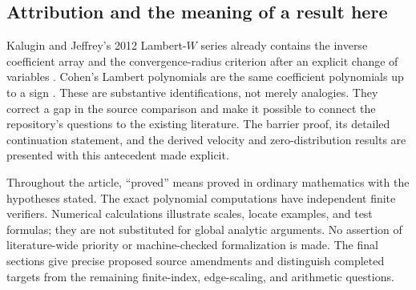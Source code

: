 \subsection{Attribution and the meaning of a result here}

Kalugin and Jeffrey's 2012 Lambert-$W$ series already contains the
inverse coefficient array and the convergence-radius criterion after
an explicit change of variables \cite{KaluginJeffrey2012}. Cohen's
Lambert polynomials are the same coefficient polynomials up to a sign
\cite{Cohen2021}. These are substantive identifications, not merely
analogies. They correct a gap in the source comparison and make it
possible to connect the repository's questions to the existing
literature. The barrier proof, its detailed continuation statement,
and the derived velocity and zero-distribution results are presented
with this antecedent made explicit.

Throughout the article, ``proved'' means proved in ordinary mathematics
with the hypotheses stated. The exact polynomial computations have
independent finite verifiers. Numerical calculations illustrate scales,
locate examples, and test formulas; they are not substituted for
global analytic arguments. No assertion of literature-wide priority
or machine-checked formalization is made. The final sections give
precise proposed source amendments and distinguish completed targets
from the remaining finite-index, edge-scaling, and arithmetic questions.

